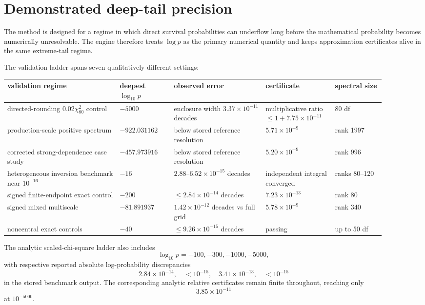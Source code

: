\documentclass[11pt]{article}
\theoremstyle{definition}
\theoremstyle{remark}
\begin{document}
\section{Demonstrated deep-tail precision}

The method is designed for a regime in which direct survival probabilities can
underflow long before the mathematical probability becomes numerically
unresolvable.  The engine therefore treats \(\log p\) as the primary numerical
quantity and keeps approximation certificates alive in the same extreme-tail
regime.

The validation ladder spans seven qualitatively different settings:

\begin{center}
\small
\begin{tabular}{@{}p{0.27\linewidth}p{0.13\linewidth}p{0.22\linewidth}p{0.16\linewidth}p{0.12\linewidth}@{}}
\toprule
validation regime & deepest $\log_{10}p$ & observed error & certificate & spectral size\\
\midrule
directed-rounding $0.02\chi^2_{80}$ control
& $-5000$ & enclosure width $3.37\times10^{-11}$ decades
& multiplicative ratio $\le 1+7.75\times10^{-11}$ & 80 df\\
production-scale positive spectrum
& $-922.031162$ & below stored reference resolution & $5.71\times10^{-9}$ & rank 1997\\
corrected strong-dependence case study
& $-457.973916$ & below stored reference resolution & $5.20\times10^{-9}$ & rank 996\\
heterogeneous inversion benchmark near $10^{-16}$
& $-16$ & $2.88$--$6.52\times10^{-15}$ decades & independent integral converged & ranks 80--120\\
signed finite-endpoint exact control
& $-200$ & $\le 2.84\times10^{-14}$ decades & $7.23\times10^{-13}$ & rank 80\\
signed mixed multiscale
& $-81.891937$ & $1.42\times10^{-12}$ decades vs full grid & $5.78\times10^{-9}$ & rank 340\\
noncentral exact controls
& $-40$ & $\le 9.26\times10^{-15}$ decades & passing & up to 50 df\\
\bottomrule
\end{tabular}
\end{center}

The analytic scaled-chi-square ladder also includes
\[
\log_{10}p=-100,-300,-1000,-5000,
\]
with respective reported absolute log-probability discrepancies
\[
2.84\times10^{-14},\quad
<10^{-15},\quad
3.41\times10^{-13},\quad
<10^{-15}
\]
in the stored benchmark output.  The corresponding analytic relative certificates
remain finite throughout, reaching only
\[
3.85\times10^{-11}
\]
at \(10^{-5000}\).
\end{document}
